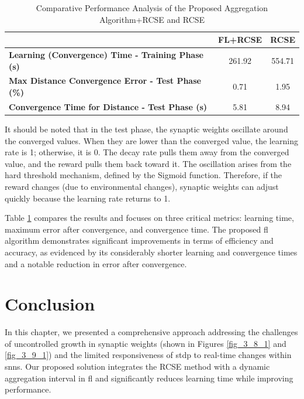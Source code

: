 \begin{table}[h]
    \centering
    \small
    \caption{Comparative Performance Analysis of the Proposed Aggregation Algorithm+\ac{RCSE} and \ac{RCSE}}
    \begingroup
    \renewcommand{\arraystretch}{1.5}
    \begin{tabular}{lcc}
    \hline
                                & \textbf{FL+\ac{RCSE}} & \textbf{\ac{RCSE}} \\
    \hline
    \textbf{Learning (Convergence) Time - Training Phase (s)}                & 261.92               & 554.71\\
    \textbf{Max Distance Convergence Error - Test Phase (\%)} & 0.71             & 1.95\\
    \textbf{Convergence Time for Distance - Test Phase (s)}             & 5.81           & 8.94\\
    \hline
    \end{tabular}
    \endgroup
    \label{tab:Results analysis}
\end{table}

It should be noted that in the test phase, the synaptic weights oscillate around the converged values. When they are lower than the converged value, the learning rate is 1; otherwise, it is 0. The decay rate pulls them away from the converged value, and the reward pulls them back toward it. The oscillation arises from the hard threshold mechanism, defined by the Sigmoid function. Therefore, if the reward changes (due to environmental changes), synaptic weights can adjust quickly because the learning rate returns to 1. 

Table \ref{tab:Results analysis} compares the results and focuses on three critical metrics: learning time, maximum error after convergence, and convergence time. The proposed \ac{fl} algorithm demonstrates significant improvements in terms of efficiency and accuracy, as evidenced by its considerably shorter learning and convergence times and a notable reduction in error after convergence.

\section{Conclusion}

In this chapter, we presented a comprehensive approach addressing the challenges of uncontrolled growth in synaptic weights (shown in Figures \ref{fig_3_8_1} and \ref{fig_3_9_1}) and the limited responsiveness of \ac{stdp} to real-time changes within \ac{snn}s. Our proposed solution integrates the \ac{RCSE} method with a dynamic aggregation interval in \ac{fl} and significantly reduces learning time while improving performance.

